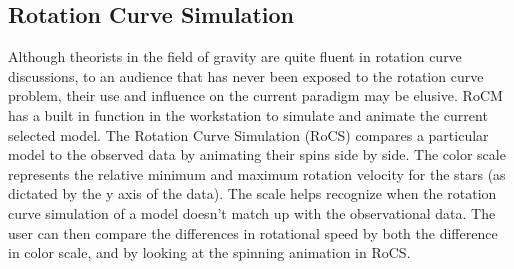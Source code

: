 \documentclass[conference]{IEEEtran-modified}
\providecommand{\e}[1]{\ensuremath{\times 10^{#1}}}
\begin{document}
%


\subsection{Rotation Curve Simulation}
Although theorists in the field of gravity are quite fluent in rotation curve discussions, to an audience that has never been exposed to the rotation curve problem, their use and influence on the current paradigm may be elusive. RoCM has a built in function in the workstation to simulate and animate the current selected model. The Rotation Curve Simulation (RoCS) compares a particular model to the observed data by animating their spins side by side. The color scale represents the relative {\color[HTML]{EA051C} minimum} and {\color[HTML]{1AAF3A} maximum} rotation velocity for the stars (as dictated by the y axis of the data). The scale helps recognize when the rotation curve simulation of a model doesn't match up with the observational data.  The user can then compare the differences in rotational speed by both the difference in color scale, and by looking at the spinning animation in RoCS.
\end{document}
